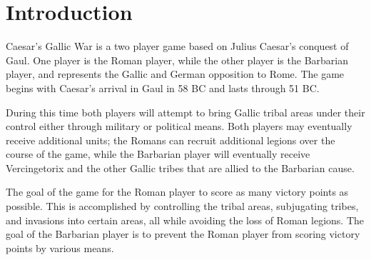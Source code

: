 \section{Introduction}
\par
Caesar's Gallic War is a two player game based on Julius Caesar's conquest of Gaul. One player is the Roman player, while the other player is the Barbarian player, and represents the Gallic and German opposition to Rome. The game begins with Caesar's arrival in Gaul in 58 BC and lasts through 51 BC.
\par
During this time both players will attempt to bring Gallic tribal areas under their control either through military or political means. Both players may eventually receive additional units; the Romans can recruit additional legions over the course of the game, while the Barbarian player will eventually receive Vercingetorix and the other Gallic tribes that are allied to the Barbarian cause.

The goal of the game for the Roman player to score as many victory points as possible. This is accomplished by controlling the tribal areas, subjugating tribes, and invasions into certain areas, all while avoiding the loss of Roman legions. The goal of the Barbarian player is to prevent the Roman player from scoring victory points by various means.